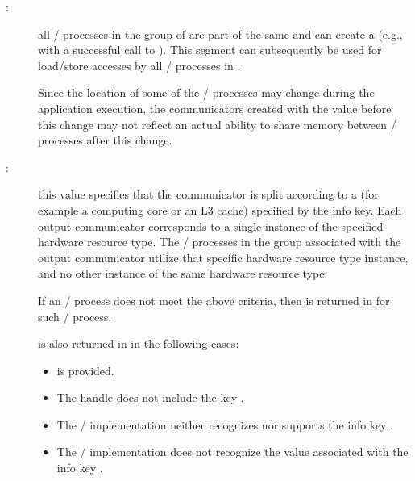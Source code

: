 \begin{description}

\item[:]all \MPI/ processes in the group of 
  are part of the same  and
  can create a 
  (e.g., with a successful call to ).
  This segment can subsequently be used for load/store accesses by all \MPI/ processes in .

  \begin{users}
    Since the location of some of the \MPI/ processes may change during the application execution,
    the communicators created with the value  before this change may not
    reflect an actual ability to share memory between \MPI/ processes after this change.
  \end{users}

\item[:]this
  value specifies that the communicator  is split according to a
   (for example a computing core or an L3 cache)
  specified by the  info key. Each output communicator
   corresponds to a single instance of the specified hardware resource type.
  The \MPI/ processes in the group associated with the output communicator 
  utilize that specific hardware resource type instance, and no other instance of the same
  hardware resource type.

  If an \MPI/ process does not meet the above criteria, then  is returned
  in  for such \MPI/ process.

   is also returned in  in the following cases:
  \begin{itemize}
  \item {} is provided.
  \item The  handle does not include the key .
  \item The \MPI/ implementation neither recognizes nor supports the info key .
  \item The \MPI/ implementation does not recognize the value associated with the info key .
  \end{itemize}


\end{description}
